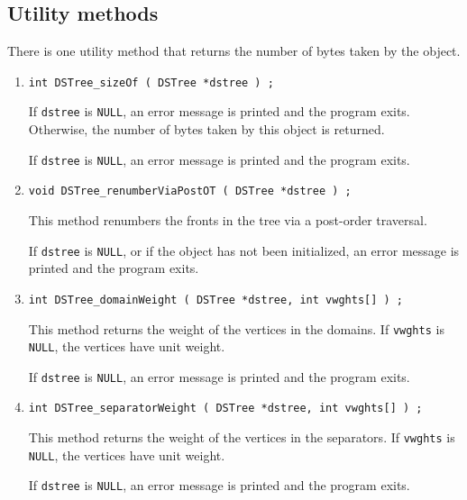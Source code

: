 \subsection{Utility methods}
\label{subsection:DSTree:proto:utilities}
\par
There is one 
utility method that returns the number of bytes taken by the object.
\par
\begin{enumerate}
\item
\begin{verbatim}
int DSTree_sizeOf ( DSTree *dstree ) ;
\end{verbatim}
If {\tt dstree} is {\tt NULL},
an error message is printed and the program exits.
Otherwise, the number of bytes taken by this object is returned.
\par {}
If {\tt dstree} is {\tt NULL},
an error message is printed and the program exits.
\item
\begin{verbatim}
void DSTree_renumberViaPostOT ( DSTree *dstree ) ;
\end{verbatim}
This method renumbers the fronts in the tree via  a post-order
traversal.
\par {}
If {\tt dstree} is {\tt NULL},
or if the object has not been initialized,
an error message is printed and the program exits.
\item
\begin{verbatim}
int DSTree_domainWeight ( DSTree *dstree, int vwghts[] ) ;
\end{verbatim}
This method returns the weight of the vertices in the domains.
If {\tt vwghts} is {\tt NULL}, the vertices have unit weight.
\par {}
If {\tt dstree} is {\tt NULL},
an error message is printed and the program exits.
\item
\begin{verbatim}
int DSTree_separatorWeight ( DSTree *dstree, int vwghts[] ) ;
\end{verbatim}
This method returns the weight of the vertices in the separators.
If {\tt vwghts} is {\tt NULL}, the vertices have unit weight.
\par {}
If {\tt dstree} is {\tt NULL},
an error message is printed and the program exits.
\end{enumerate}
\par
